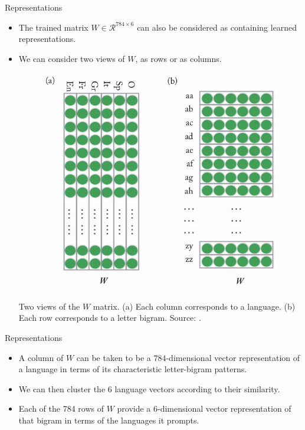 \documentclass[handout]{beamer}
\begin{document}
\begin{frame}{Representations}

\begin{scriptsize}
\begin{itemize}
\item The trained matrix $W \in \mathcal{R}^{784 \times 6}$  can also be considered as containing learned representations.
\item We can consider two views of $W$, as rows or as columns.

\begin{figure}[htb]
	\centering
	 \includegraphics[scale=0.35]{pics/2rep.png}
\end{figure}

Two views of the $W$ matrix. (a) Each column corresponds to a language. (b) Each row
corresponds to a letter bigram. Source: \cite{goldberg2017neural}.


\end{itemize}
\end{scriptsize}
\end{frame}



\begin{frame}{Representations}

\begin{scriptsize}
\begin{itemize}
\item A column of $W$ can be taken to be a $784$-dimensional vector representation of a language in terms of its characteristic letter-bigram patterns.
\item We can then cluster the 6 language vectors according to their similarity.
\item Each of the 784 rows of $W$ provide a 6-dimensional vector representation of that bigram in terms of the languages it prompts.

\end{itemize}
\end{scriptsize}
\end{frame}
\end{document}
